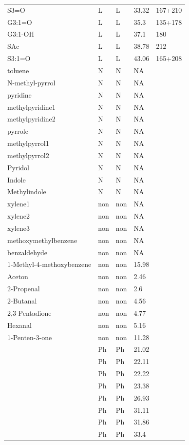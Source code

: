 \documentclass[journal abbreviation]{copernicus}
\begin{document}
\begin{table}[t]
\begin{tabular}{lllll}
S3=O&L&L&33.32&167+210\\ 
G3:1=O&L&L&35.3&135+178\\ 
G3:1-OH&L&L&37.1&180\\ 
SAc&L&L&38.78&212\\ 
S3:1=O&L&L&43.06&165+208\\ 
toluene&N&N&NA&\\ 
N-methyl-pyrrol&N&N&NA&\\ 
pyridine&N&N&NA&\\ 
methylpyridine1&N&N&NA&\\ 
methylpyridine2&N&N&NA&\\ 
pyrrole&N&N&NA&\\ 
methylpyrrol1&N&N&NA&\\ 
methylpyrrol2&N&N&NA&\\ 
Pyridol&N&N&NA&\\ 
Indole&N&N&NA&\\ 
Methylindole&N&N&NA&\\ 
xylene1&non&non&NA&\\ 
xylene2&non&non&NA&\\ 
xylene3&non&non&NA&\\ 
methoxymethylbenzene&non&non&NA&\\ 
benzaldehyde&non&non&NA&\\ 
1-Methyl-4-methoxybenzene&non&non&15.98&\\ 
Aceton&non&non&2.46&\\ 
2-Propenal&non&non&2.6&\\ 
2-Butanal&non&non&4.56&\\ 
2,3-Pentadione&non&non&4.77&\\ 
Hexanal&non&non&5.16&\\ 
1-Penten-3-one&non&non&11.28&\\ 
&Ph&Ph&21.02&\\ 
&Ph&Ph&22.11&\\ 
&Ph&Ph&22.22&\\ 
&Ph&Ph&23.38&\\ 
&Ph&Ph&26.93&\\ 
&Ph&Ph&31.11&\\ 
&Ph&Ph&31.86&\\ 
&Ph&Ph&33.4&\\ 


\end{tabular}
\end{table}
\end{document}
